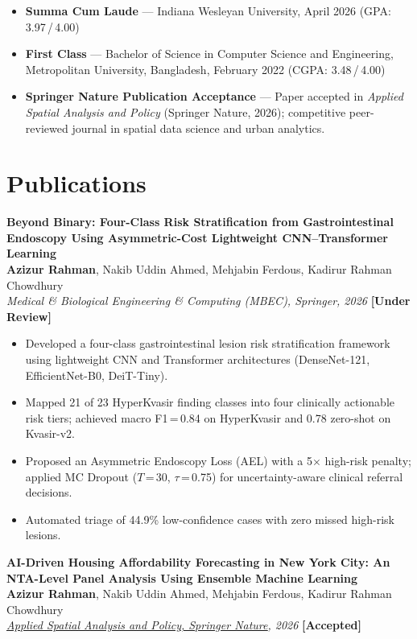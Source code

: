 \documentclass[11pt, letterpaper]{article}
\newcommand{\pubentry}[4]{%
  \noindent\textbf{#1}\\[1pt]
  \noindent #2\\[1pt]
  \noindent\textit{#3} \hfill \textbf{[#4]}\\[4pt]
}
\begin{document}
\begin{itemize}
  \item \textbf{Summa Cum Laude} — Indiana Wesleyan University, April 2026
        (GPA: 3.97\,/\,4.00)
  \item \textbf{First Class} — Bachelor of Science in Computer Science and Engineering,
        Metropolitan University, Bangladesh, February 2022 (CGPA: 3.48\,/\,4.00)
  \item \textbf{Springer Nature Publication Acceptance} — Paper accepted in
        \textit{Applied Spatial Analysis and Policy} (Springer Nature, 2026);
        competitive peer-reviewed journal in spatial data science and urban analytics.
\end{itemize}

\section{Publications}

\pubentry
  {Beyond Binary: Four-Class Risk Stratification from Gastrointestinal Endoscopy
   Using Asymmetric-Cost Lightweight CNN–Transformer Learning}
  {\textbf{Azizur Rahman}, Nakib Uddin Ahmed, Mehjabin Ferdous, Kadirur Rahman Chowdhury}
  {Medical \& Biological Engineering \& Computing (MBEC), Springer, 2026}
  {Under Review}

\begin{itemize}
  \item Developed a four-class gastrointestinal lesion risk stratification framework
        using lightweight CNN and Transformer architectures (DenseNet-121, EfficientNet-B0,
        DeiT-Tiny).
  \item Mapped 21 of 23 HyperKvasir finding classes into four clinically actionable risk
        tiers; achieved macro F1\,=\,0.84 on HyperKvasir and 0.78 zero-shot on Kvasir-v2.
  \item Proposed an Asymmetric Endoscopy Loss (AEL) with a 5$\times$ high-risk penalty;
        applied MC Dropout ($T$\,=\,30, $\tau$\,=\,0.75) for uncertainty-aware clinical
        referral decisions.
  \item Automated triage of 44.9\% low-confidence cases with zero missed high-risk lesions.
\end{itemize}

\vspace{6pt}

\pubentry
  {AI-Driven Housing Affordability Forecasting in New York City: An NTA-Level
   Panel Analysis Using Ensemble Machine Learning}
  {\textbf{Azizur Rahman}, Nakib Uddin Ahmed, Mehjabin Ferdous, Kadirur Rahman Chowdhury}
  {\href{https://assets-eu.researchsquare.com/files/rs-9348598/v1_covered_5474f471-05ad-4995-ad0b-3d49f8748f9f.pdf?c=1778254144}{\underline{Applied Spatial Analysis and Policy, Springer Nature}}, 2026}
  {Accepted}
\end{document}

